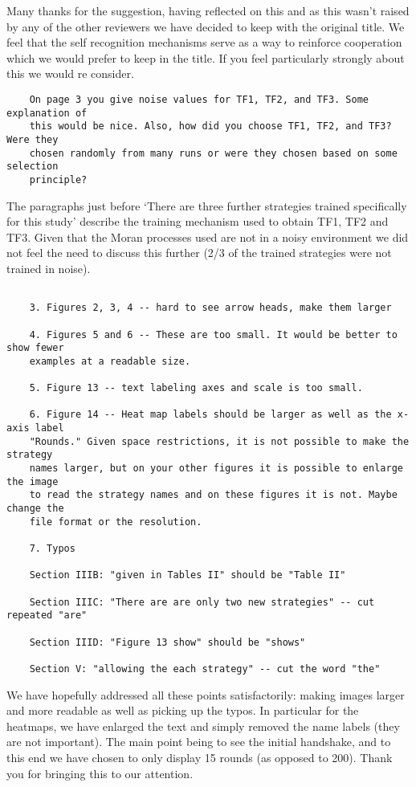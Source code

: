 \documentclass[a4]{article}
\begin{document}
Many thanks for the suggestion, having reflected on this and as this wasn't
raised by any of the other reviewers we have decided to keep with the original
title. We feel that the self recognition mechanisms serve as a way to reinforce
cooperation which we would prefer to keep in the title. If you feel particularly
strongly about this we would re consider.

\begin{verbatim}
    On page 3 you give noise values for TF1, TF2, and TF3. Some explanation of
    this would be nice. Also, how did you choose TF1, TF2, and TF3? Were they
    chosen randomly from many runs or were they chosen based on some selection
    principle?
\end{verbatim}

The paragraphs just before `There are three further strategies trained
specifically for this
study' describe the training mechanism used to obtain TF1, TF2 and TF3.  Given
that the Moran processes used are not in a noisy environment we did not feel the
need to discuss this further (2/3 of the trained strategies were not trained in
noise).

\begin{verbatim}

    3. Figures 2, 3, 4 -- hard to see arrow heads, make them larger

    4. Figures 5 and 6 -- These are too small. It would be better to show fewer
    examples at a readable size.

    5. Figure 13 -- text labeling axes and scale is too small.

    6. Figure 14 -- Heat map labels should be larger as well as the x-axis label
    "Rounds." Given space restrictions, it is not possible to make the strategy
    names larger, but on your other figures it is possible to enlarge the image
    to read the strategy names and on these figures it is not. Maybe change the
    file format or the resolution.

    7. Typos 

    Section IIIB: "given in Tables II" should be "Table II"

    Section IIIC: "There are are only two new strategies" -- cut repeated "are"

    Section IIID: "Figure 13 show" should be "shows"

    Section V: "allowing the each strategy" -- cut the word "the"
\end{verbatim}

We have hopefully addressed all these points satisfactorily: making images
larger and more readable as well as picking up the typos. 
In particular for the heatmaps, we have enlarged the text and simply removed the
name labels (they are not important). The main point being to see the initial
handshake, and to this end we have chosen to only display 15 rounds (as
opposed to 200).
Thank you for bringing this to our attention.
\end{document}
